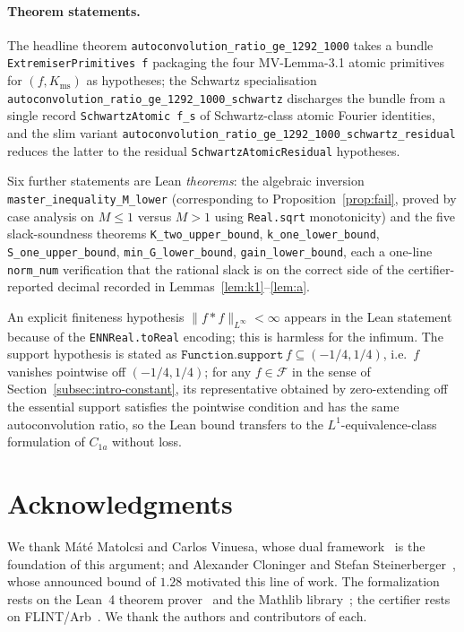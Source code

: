 \documentclass[11pt, letterpaper]{article}
\theoremstyle{paperplain}
\theoremstyle{paperdef}
\newcommand{\Linf}{L^\infty}
\newcommand{\Kms}{K_{\mathrm{ms}}}
\begin{document}
\paragraph{Theorem statements.}
The headline theorem
\texttt{autoconvolution\_ratio\_ge\_1292\_1000} takes a bundle
\texttt{ExtremiserPrimitives f} packaging the four MV-Lemma-3.1
atomic primitives for $(f,\Kms)$ as hypotheses; the Schwartz
specialisation
\texttt{autoconvolution\_ratio\_ge\_1292\_1000\_schwartz}
discharges the bundle from a single record
\texttt{SchwartzAtomic f\_s} of Schwartz-class atomic Fourier
identities, and the slim variant
\texttt{autoconvolution\_ratio\_ge\_1292\_1000\_schwartz\_residual}
reduces the latter to the residual \texttt{SchwartzAtomicResidual}
hypotheses.

Six further statements are Lean \emph{theorems}: the algebraic
inversion \texttt{master\_inequality\_M\_lower} (corresponding to
Proposition~\ref{prop:fail}, proved by case analysis on $M\le 1$ versus
$M>1$ using \texttt{Real.sqrt} monotonicity) and the five
slack-soundness theorems \texttt{K\_two\_upper\_bound},
\texttt{k\_one\_lower\_bound}, \texttt{S\_one\_upper\_bound},
\texttt{min\_G\_lower\_bound}, \texttt{gain\_lower\_bound}, each a
one-line \texttt{norm\_num} verification that the rational slack is on
the correct side of the certifier-reported decimal recorded in
Lemmas~\ref{lem:k1}--\ref{lem:a}.

An explicit finiteness hypothesis $\|f*f\|_{\Linf}<\infty$ appears in
the Lean statement because of the \texttt{ENNReal.toReal} encoding;
this is harmless for the infimum.  The support hypothesis is stated
as $\texttt{Function.support}\,f\subseteq(-1/4,1/4)$, i.e.\
$f$ vanishes pointwise off $(-1/4,1/4)$; for any
$f\in\mathcal{F}$ in the sense of Section~\ref{subsec:intro-constant},
its representative obtained by zero-extending off the essential
support satisfies the pointwise condition and has the same
autoconvolution ratio, so the Lean bound transfers to the
$L^1$-equivalence-class formulation of $C_{1a}$ without loss.

\section*{Acknowledgments}

We thank M\'at\'e Matolcsi and Carlos Vinuesa, whose dual
framework~\cite{MV10} is the foundation of this argument; and
Alexander Cloninger and Stefan Steinerberger~\cite{CS17}, whose
announced bound of $1.28$ motivated this line of work.  The
formalization rests on the Lean~4 theorem prover~\cite{Lean} and the
Mathlib library~\cite{Mathlib}; the certifier rests on
FLINT/Arb~\cite{Flint}.  We thank the authors and contributors of
each.
\end{document}
